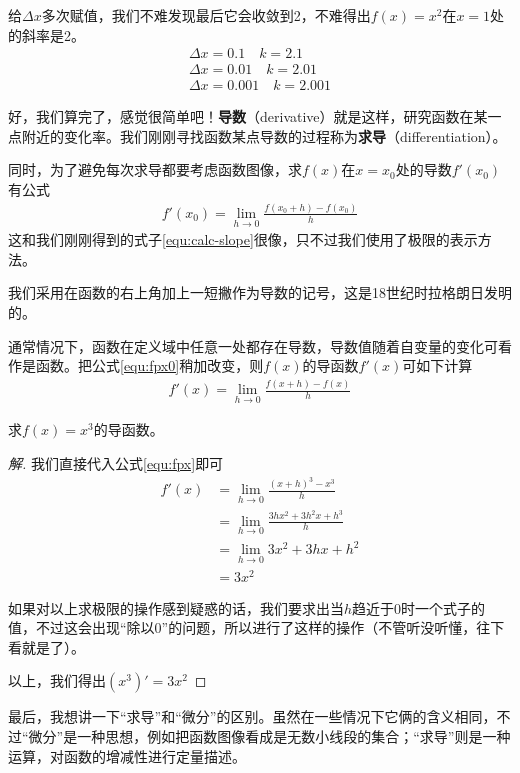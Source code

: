 给$\Delta x$多次赋值，我们不难发现最后它会收敛到2，不难得出$f(x)=x^2$在$x=1$处的斜率是2。
\begin{gather*}
    \Delta x=0.1 \quad k=2.1 \\
    \Delta x=0.01 \quad k=2.01 \\
    \Delta x=0.001 \quad k=2.001
\end{gather*}

好，我们算完了，感觉很简单吧！\textbf{导数}（derivative）就是这样，研究函数在某一点附近的变化率。我们刚刚寻找函数某点导数的过程称为\textbf{求导}（differentiation）。

同时，为了避免每次求导都要考虑函数图像，求$f(x)$在$x=x_0$处的导数$f'(x_0)$有公式
\begin{gather}
    f'(x_0)=\lim_{h\to0}\frac{f(x_0+h)-f(x_0)}{h} \label{equ:fpx0}
\end{gather}
这和我们刚刚得到的式子\eqref{equ:calc-slope}很像，只不过我们使用了极限的表示方法。

我们采用在函数的右上角加上一短撇作为导数的记号，这是18世纪时拉格朗日发明的。

通常情况下，函数在定义域中任意一处都存在导数，导数值随着自变量的变化可看作是函数。把公式\eqref{equ:fpx0}稍加改变，则$f(x)$的导函数$f'(x)$可如下计算
\begin{gather}
    f'(x)=\lim_{h\to0}\frac{f(x+h)-f(x)}{h} \label{equ:fpx}
\end{gather}

\begin{example}
    求$f(x)=x^3$的导函数。
\end{example}

\begin{proof}[解]
    我们直接代入公式\eqref{equ:fpx}即可
    \begin{align*}
        f'(x)&=\lim_{h\to0}\frac{(x+h)^3-x^3}{h} \\
             &=\lim_{h\to0}\frac{3hx^2+3h^2x+h^3}{h} \\
             &=\lim_{h\to0}3x^2+3hx+h^2 \\
             &=3x^2
    \end{align*}

    如果对以上求极限的操作感到疑惑的话，我们要求出当$h$趋近于0时一个式子的值，不过这会出现“除以0”的问题，所以进行了这样的操作（不管听没听懂，往下看就是了）。

    以上，我们得出$(x^3)'=3x^2$\qedhere
\end{proof}

最后，我想讲一下“求导”和“微分”的区别。虽然在一些情况下它俩的含义相同，不过“微分”是一种思想，例如把函数图像看成是无数小线段的集合；“求导”则是一种运算，对函数的增减性进行定量描述。

